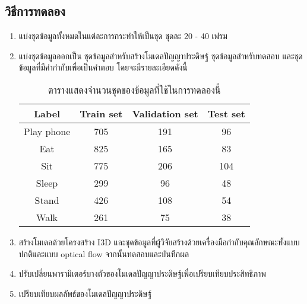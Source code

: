 \subsection*{วิธีการทดลอง}
	\begin{enumerate}
		\setlength\itemsep{-0.25em}
		\item แบ่งชุดข้อมูลทั้งหมดในแต่ละการกระทำให้เป็นชุด ชุดละ 20 - 40 เฟรม 
        \item แบ่งชุดข้อมูลออกเป็น ชุดข้อมูลสำหรับสร้างโมเดลปัญญาประดิษฐ์ ชุดข้อมูลสำหรับทดสอบ และชุดข้อมูลที่มีคำกำกับเพื่อเป็นคำตอบ โดยจะมีรายละเอียดดังนี้
            \begin{table}[!ht]
                \centering
                \begin{tabular}{|c|c|c|c|}
                    \hline
                    Label & Train set & Validation set & Test set\\
                    \hline
                    Play phone & 705 & 191 & 96\\
                    Eat & 825 & 165 & 83\\
                    Sit & 775 & 206 & 104\\
                    Sleep & 299 & 96 & 48\\
                    Stand & 426 & 108 & 54\\
                    Walk & 261 & 75 & 38\\
                    \hline
                \end{tabular}
                \caption{ตารางแสดงจำนวนชุดของข้อมูลที่ใช้ในการทดลองนี้}
                \label{tab: I3D_datasetInfo}
            \end{table}
        \item สร้างโมเดลด้วยโครงสร้าง I3D และชุดข้อมูลที่ผู้วิจัยสร้างด้วยเครื่องมือกำกับคุณลักษณะทั้งแบบปกติและแบบ optical flow จากนั้นทดสอบและบันทึกผล 
		\item ปรับเปลี่ยนพารามิเตอร์บางตัวของโมเดลปัญญาประดิษฐ์เพื่อเปรียบเทียบประสิทธิภาพ
		\item เปรียบเทียบผลลัพธ์ของโมเดลปัญญาประดิษฐ์
\end{enumerate}
\clearpage